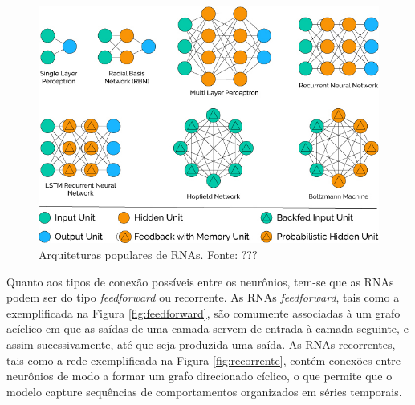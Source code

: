 \begin{figure}[!h]
	\caption{Arquiteturas populares de RNAs. Fonte: ???}
	\label{fig:popular_archs}
	\includegraphics[width=\linewidth]{img/popular_archs}
\end{figure}


Quanto aos tipos de conexão possíveis entre os neurônios, tem-se que as RNAs podem ser do tipo \emph{feedforward} ou recorrente. As RNAs \emph{feedforward}, tais como a exemplificada na Figura \ref{fig:feedforward}, são comumente associadas à um grafo acíclico em que as saídas de uma camada servem de entrada à camada seguinte, e assim sucessivamente, até que seja produzida uma saída. As RNAs recorrentes, tais como a rede exemplificada na Figura \ref{fig:recorrente}, contém conexões entre neurônios de modo a formar um grafo direcionado cíclico, o que permite que o modelo capture sequências de comportamentos organizados em séries temporais.

